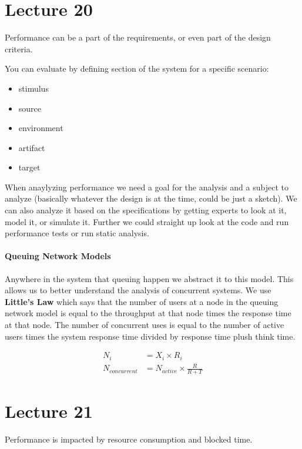 \documentclass{article}
\begin{document}
\section*{Lecture 20} %
\label{sec:lecture_20}
Performance can be a part of the requirements, or even part of the design criteria.

You can evaluate by defining section of the system for a specific scenario:
\begin{itemize}
    \item stimulus
    \item source
    \item environment
    \item artifact
    \item target
\end{itemize}

When anaylyzing performance we need a goal for the analysis and a subject to analyze (basically whatever the design is at the time, could be just a sketch). We can also analyze it based on the specifications by getting experts to look at it, model it, or simulate it. Further we could straight up look at the code and run performance tests or run static analysis.

\paragraph{Queuing Network Models} %
\label{par:queuing_network_models}
Anywhere in the system that queuing happen we abstract it to this model. This allows us to better understand the analysis of concurrent systems. We use \textbf{Little's Law} which says that the number of users at a node in the queuing network model is equal to the throughput at that node times the response time at that node. The number of concurrent uses is equal to the number of active users times the system response time divided by response time plush think time.

\begin{align*}
    N_i &= X_i \times R_i\\
    N_{concurrent} &= N_{active}\times \frac{R}{R+T}
\end{align*}




\section*{Lecture 21} %
\label{sec:lecture_21}
Performance is impacted by resource consumption and blocked time.
\end{document}
